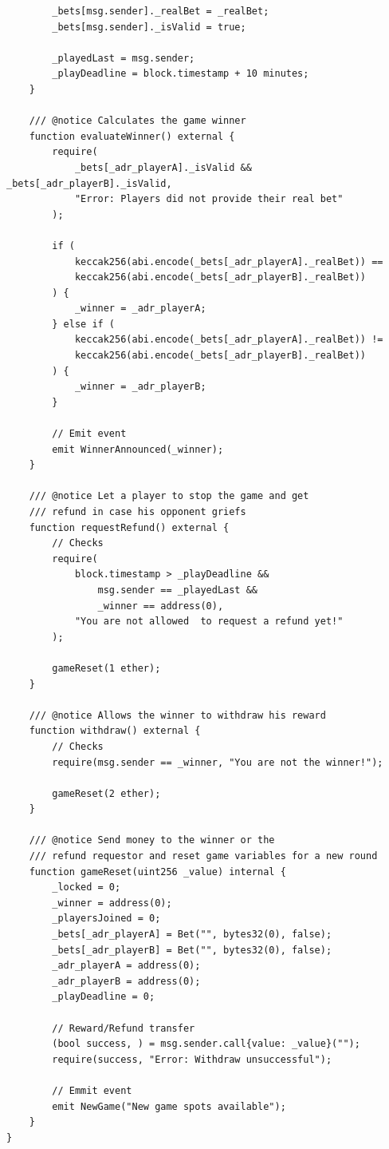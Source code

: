 \documentclass[12pt,a4paper]{article}
\begin{document}
\begin{lstlisting}
        _bets[msg.sender]._realBet = _realBet;
        _bets[msg.sender]._isValid = true;

        _playedLast = msg.sender;
        _playDeadline = block.timestamp + 10 minutes;
    }

    /// @notice Calculates the game winner
    function evaluateWinner() external {
        require(
            _bets[_adr_playerA]._isValid && _bets[_adr_playerB]._isValid,
            "Error: Players did not provide their real bet"
        );

        if (
            keccak256(abi.encode(_bets[_adr_playerA]._realBet)) ==
            keccak256(abi.encode(_bets[_adr_playerB]._realBet))
        ) {
            _winner = _adr_playerA;
        } else if (
            keccak256(abi.encode(_bets[_adr_playerA]._realBet)) !=
            keccak256(abi.encode(_bets[_adr_playerB]._realBet))
        ) {
            _winner = _adr_playerB;
        }

        // Emit event
        emit WinnerAnnounced(_winner);
    }

    /// @notice Let a player to stop the game and get 
    /// refund in case his opponent griefs
    function requestRefund() external {
        // Checks
        require(
            block.timestamp > _playDeadline &&
                msg.sender == _playedLast &&
                _winner == address(0),
            "You are not allowed  to request a refund yet!"
        );

        gameReset(1 ether);
    }

    /// @notice Allows the winner to withdraw his reward
    function withdraw() external {
        // Checks
        require(msg.sender == _winner, "You are not the winner!");

        gameReset(2 ether);
    }

    /// @notice Send money to the winner or the 
    /// refund requestor and reset game variables for a new round
    function gameReset(uint256 _value) internal {
        _locked = 0;
        _winner = address(0);
        _playersJoined = 0;
        _bets[_adr_playerA] = Bet("", bytes32(0), false);
        _bets[_adr_playerB] = Bet("", bytes32(0), false);
        _adr_playerA = address(0);
        _adr_playerB = address(0);
        _playDeadline = 0;

        // Reward/Refund transfer
        (bool success, ) = msg.sender.call{value: _value}("");
        require(success, "Error: Withdraw unsuccessful");

        // Emmit event
        emit NewGame("New game spots available");
    }
}
\end{lstlisting}
\end{document}
